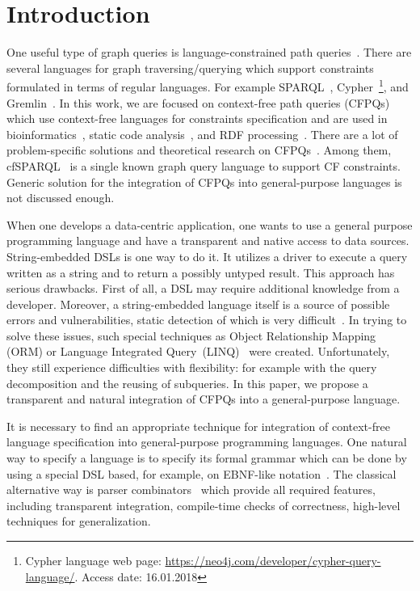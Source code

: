 \section{Introduction}

One useful type of graph queries is language-constrained path queries~\cite{FLCpathProblem}.
There are several languages for graph traversing/querying which support constraints formulated in terms of regular languages.
For example SPARQL~\cite{sparql}, Cypher~\footnote{Cypher language web page: \url{https://neo4j.com/developer/cypher-query-language/}. Access date: 16.01.2018}, and Gremlin~\cite{gremlin}.
In this work, we are focused on context-free path queries (CFPQs) which use context-free languages for constraints specification and are used in bioinformatics~\cite{GraphQueryWithEarley}, static code analysis~\cite{Reps, Zheng, LabelFlowCFLReachability, specificationCFLReachability, JavaCFL}, and RDF processing~\cite{CFGonRDF}. 
There are a lot of problem-specific solutions and theoretical research on CFPQs~\cite{Yannakakis, ConjCFPathQuery, Hellings16, GrigorevR16, QueryGraphWithData, RegularDBQuery, GraphQueryWithEarley, graphDB}.
Among them, cfSPARQL~\cite{CFGonRDF} is a single known graph query language to support CF constraints. Generic solution for the integration of CFPQs into general-purpose languages is not discussed enough.

When one develops a data-centric application, one wants to use a general purpose programming language and have a transparent and native access to data sources.
String-embedded DSLs is one way to do it. 
It utilizes a driver to execute a query written as a string and to return a possibly untyped result. 
This approach has serious drawbacks.
First of all, a DSL may require additional knowledge from a developer.
Moreover, a string-embedded language itself is a source of possible errors and vulnerabilities, static detection of which is very difficult~\cite{stringEmbeddedLanguagesProblem}.  
In trying to solve these issues, such special techniques as Object Relationship Mapping (ORM) or Language Integrated Query~(LINQ)~\cite{LINQ1, LINQ2, LinqRDF} were created. Unfortunately, they still experience difficulties with flexibility: for example with the query decomposition and the reusing of subqueries.
In this paper, we propose a transparent and natural integration of CFPQs into a general-purpose language. 

It is necessary to find an appropriate technique for integration of context-free language specification into general-purpose programming languages.
One natural way to specify a language is to specify its formal grammar which can be done by using a special DSL based, for example, on EBNF-like notation~\cite{EBNFISO}.
The classical alternative way is parser combinators~\cite{MonadicPArserCombinators} which provide all required features, including transparent integration, compile-time checks of correctness, high-level techniques for generalization.

